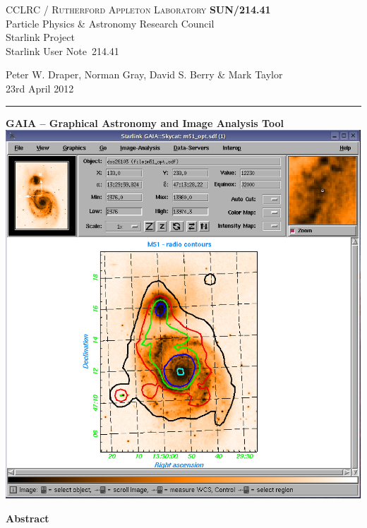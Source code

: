 \documentclass[twoside,11pt]{article}
\newcommand{\stardoccategory}  {Starlink User Note}
\newcommand{\stardocinitials}  {SUN}
\newcommand{\stardocnumber}    {214.41}
\newcommand{\stardocauthors}   {Peter W. Draper,
                                Norman Gray,
                                David S. Berry \&
                                Mark Taylor }
\newcommand{\stardocdate}      {23rd April 2012}
\newcommand{\stardoctitle}     {GAIA --
                                Graphical Astronomy and Image Analysis Tool}
\newcommand{\stardocname}{\stardocinitials /\stardocnumber}
\newenvironment{latexonly}{}{}
\renewcommand{\_}{\texttt{\symbol{95}}}
\begin{document}
\thispagestyle{empty}

\begin{latexonly}
   CCLRC / \textsc{Rutherford Appleton Laboratory} \hfill \textbf{\stardocname}\\
   {\large Particle Physics \& Astronomy Research Council}\\
   {\large Starlink Project\\}
   {\large \stardoccategory\ \stardocnumber}
   \begin{flushright}
   \stardocauthors\\
   \stardocdate
   \end{flushright}
   \vspace{-4mm}
   \rule{\textwidth}{0.5mm}
   \vspace{5mm}
   \begin{center}
   {\Large\textbf{\stardoctitle \\ [2.5ex]}}
   \vspace{5mm}
   \includegraphics[totalheight=5in]{sun214fig.ps}
   \end{center}

   \begin{center}
      {\Large\textbf{Abstract}}
   \end{center}
\end{latexonly}
\end{document}
